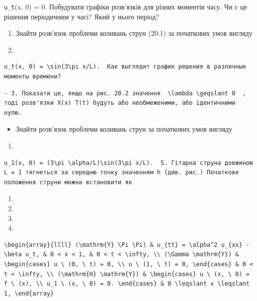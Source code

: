 \documentclass[
  ukrainian,
]{article}
\providecommand{\tightlist}{%
  \setlength{\itemsep}{0pt}\setlength{\parskip}{0pt}}
\begin{document}
\texttt{u\_t}(x, 0) = 0. Побудувати графіки розв'язків для різних
моментів часу. Чи є це рішення періодичним у часі? Який у нього період?

\begin{enumerate}
\def\labelenumi{\arabic{enumi}.}
\setcounter{enumi}{1}
\item
  Знайти розв'язок проблеми коливань струн (20.1) за початкових умов
  вигляду
\item
\end{enumerate}

\begin{verbatim}
u_t(x, 0) = \sin(3\pi x/L).  Как выглядит график решения в различные моменты времени?
\end{verbatim}

\begin{verbatim}
- 3. Показати це, якщо на рис. 20.2 значення  \lambda \geqslant 0  , тоді розв'язки X(x) T(t) будуть або необмеженими, або ідентичними нулю.
\end{verbatim}

\begin{itemize}
\tightlist
\item
  Знайти розв'язок проблеми коливань струн за початкових умов вигляду
\end{itemize}

\begin{enumerate}
\def\labelenumi{\arabic{enumi}.}
\setcounter{enumi}{11}
\tightlist
\item
\end{enumerate}

\begin{verbatim}
u_1(x, 0) = (3\pi \alpha/L)\sin(3\pi x/L).  5. Гітарна струна довжиною L = 1 тягнеться за середню точку значенням h (див. рис.) Початкове положення струни можна встановити як
\end{verbatim}

\begin{enumerate}
\def\labelenumi{\arabic{enumi}.}
\setcounter{enumi}{12}
\tightlist
\item
\item
\item
\item
\end{enumerate}

\begin{verbatim}
\begin{array}{llll} (\mathrm{Y} \Pi \Pi) & u_{tt} = \alpha^2 u_{xx} - \beta u_t, & 0 < x < 1, & 0 < t < \infty, \\ (\Gamma \mathrm{Y}) & \begin{cases} u \ (0, \ t) = 0, \\ u \ (1, \ t) = 0, \end{cases} & 0 < t < \infty, \\ (\mathrm{H} \mathrm{Y}) & \begin{cases} u \ (x, \ 0) = f \ (x), \\ u_1 \ (x, \ 0) = 0. \end{cases} & 0 \leqslant x \leqslant 1, \end{array}
\end{verbatim}
\end{document}
